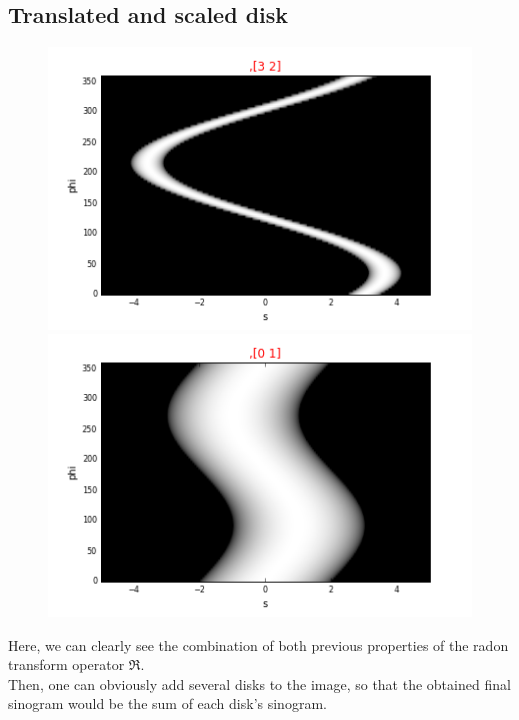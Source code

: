\documentclass[a4,12pt]{article}
\begin{document}
\subsection{Translated and scaled disk}
\begin{figure}[h!]
   \begin{minipage}[c]{.46\linewidth}
      \includegraphics[scale=0.5]{../images/sinograms/translatedAndScaledDisk.png} 
   \end{minipage} \hfill
   \begin{minipage}[c]{.46\linewidth}
      \includegraphics[scale=0.5]{../images/sinograms/translatedAndScaledDisk1.png} 
   \end{minipage}
\end{figure}
Here, we can clearly see the combination of both previous properties of the radon transform operator $\Re$. \\

Then, one can obviously add several disks to the image, so that the obtained final sinogram would be the sum of each disk's sinogram.
\end{document}
